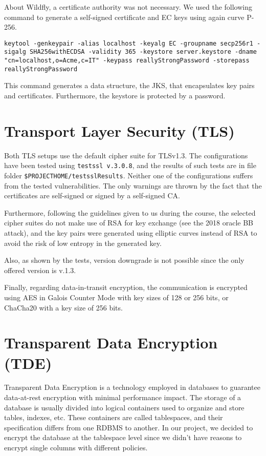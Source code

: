 About Wildfly, a certificate authority was not necessary. We used the following command to generate a self-signed certificate and EC keys using again curve P-256.

\begin{center}
    \texttt{keytool -genkeypair -alias localhost -keyalg EC -groupname secp256r1 -sigalg SHA256withECDSA -validity 365 -keystore server.keystore -dname "cn=localhost,o=Acme,c=IT" -keypass reallyStrongPassword -storepass reallyStrongPassword}
\end{center}

This command generates a data structure, the JKS, that encapsulates key pairs and certificates. Furthermore, the keystore is protected by a password.

\section{Transport Layer Security (TLS)}

Both TLS setups use the default cipher suite for TLSv1.3. The configurations have been tested using \texttt{testssl v.3.0.8}, and the results of such tests are in file folder \texttt{\${PROJECT\textunderscore HOME}/testsslResults}. Neither one of the configurations suffers from the tested vulnerabilities. The only warnings are thrown by the fact that the certificates are self-signed or signed by a self-signed CA.

Furthermore, following the guidelines given to us during the course, the selected cipher suites do not make use of RSA for key exchange (see the 2018 oracle BB attack), and the key pairs were generated using elliptic curves instead of RSA to avoid the risk of low entropy in the generated key.

Also, as shown by the tests, version downgrade is not possible since the only offered version is v.1.3. 

Finally, regarding data-in-transit encryption, the communication is encrypted using AES in Galois Counter Mode with key sizes of 128 or 256 bits, or ChaCha20 with a key size of 256 bits.

\section{Transparent Data Encryption (TDE)}

Transparent Data Encryption is a technology employed in databases to guarantee data-at-rest encryption with minimal performance impact. The storage of a database is usually divided into logical containers used to organize and store tables, indexes, etc. These containers are called tablespaces, and their specification differs from one RDBMS to another. In our project, we decided to encrypt the database at the tablespace level since we didn't have reasons to encrypt single columns with different policies.

